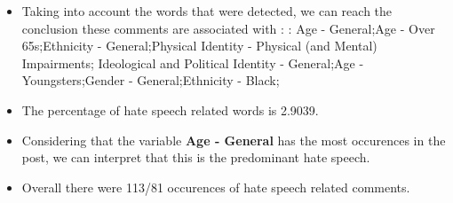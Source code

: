 \documentclass[11pt]{article}
\begin{document}
\begin{itemize}\item Taking into account the words that were detected, we can reach the conclusion these comments are associated with : : Age - General;Age - Over 65s;Ethnicity - General;Physical Identity - Physical (and Mental) Impairments; Ideological and Political Identity - General;Age - Youngsters;Gender - General;Ethnicity - Black;%

\item The percentage of hate speech related words is 2.9039.

\item Considering that the variable \textbf{Age - General} has the most occurences in the post, we can interpret that this is the predominant hate speech.

\item Overall there were 113/81 occurences of hate speech related comments.\end{itemize}
\end{document}
